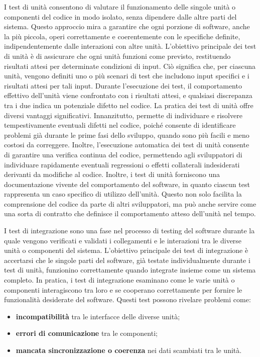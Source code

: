 I test di unità consentono di valutare il funzionamento delle singole unità o componenti del codice in modo isolato, senza dipendere dalle altre parti del sistema. Questo approccio mira a garantire che ogni porzione di software, anche la più piccola, operi correttamente e coerentemente con le specifiche definite, indipendentemente dalle interazioni con altre unità. L'obiettivo principale dei test di unità è di assicurare che ogni unità funzioni come previsto, restituendo risultati attesi per determinate condizioni di input. Ciò significa che, per ciascuna unità, vengono definiti uno o più scenari di test che includono input specifici e i risultati attesi per tali input. Durante l'esecuzione dei test, il comportamento effettivo dell'unità viene confrontato con i risultati attesi, e qualsiasi discrepanza tra i due indica un potenziale difetto nel codice. La pratica dei test di unità offre diversi vantaggi significativi. Innanzitutto, permette di individuare e risolvere tempestivamente eventuali difetti nel codice, poiché consente di identificare problemi già durante le prime fasi dello sviluppo, quando sono più facili e meno costosi da correggere. Inoltre, l'esecuzione automatica dei test di unità consente di garantire una verifica continua del codice, permettendo agli sviluppatori di individuare rapidamente eventuali regressioni o effetti collaterali indesiderati derivanti da modifiche al codice.
Inoltre, i test di unità forniscono una documentazione vivente del comportamento del software, in quanto ciascun test rappresenta un caso specifico di utilizzo dell'unità. Questo non solo facilita la comprensione del codice da parte di altri sviluppatori, ma può anche servire come una sorta di contratto che definisce il comportamento atteso dell'unità nel tempo.

I test di integrazione sono una fase nel processo di testing del software durante la quale vengono verificati e validati i collegamenti e le interazioni tra le diverse unità o componenti del sistema. L'obiettivo principale dei test di integrazione è accertarsi che le singole parti del software, già testate individualmente durante i test di unità, funzionino correttamente quando integrate insieme come un sistema completo. In pratica, i test di integrazione esaminano come le varie unità o componenti interagiscono tra loro e se cooperano correttamente per fornire le funzionalità desiderate del software. Questi test possono rivelare problemi come:
\begin{itemize}
	\item \textbf{incompatibilità} tra le interfacce delle diverse unità;
	\item \textbf{errori di comunicazione} tra le componenti;
	\item \textbf{mancata sincronizzazione o coerenza} nei dati scambiati tra le unità.
\end{itemize}

